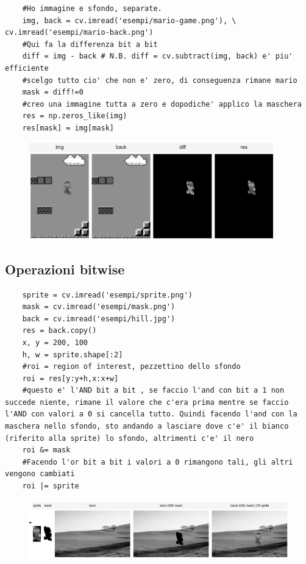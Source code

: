 \begin{lstlisting}
	#Ho immagine e sfondo, separate. 
	img, back = cv.imread('esempi/mario-game.png'), \ cv.imread('esempi/mario-back.png')
	#Qui fa la differenza bit a bit
	diff = img - back # N.B. diff = cv.subtract(img, back) e' piu' efficiente
	#scelgo tutto cio' che non e' zero, di conseguenza rimane mario
	mask = diff!=0 
	#creo una immagine tutta a zero e dopodiche' applico la maschera
	res = np.zeros_like(img) 
	res[mask] = img[mask]
\end{lstlisting}

\begin{figure}[htp]
	\includegraphics[width=300pt]{./immagini/mario_differenza.png}
	\label{img:mario_differenza}
\end{figure}

\newpage

\subsection{Operazioni bitwise}

\begin{lstlisting}
	sprite = cv.imread('esempi/sprite.png')
	mask = cv.imread('esempi/mask.png')
	back = cv.imread('esempi/hill.jpg')
	res = back.copy()
	x, y = 200, 100
	h, w = sprite.shape[:2]
	#roi = region of interest, pezzettino dello sfondo
	roi = res[y:y+h,x:x+w]
	#questo e' l'AND bit a bit , se faccio l'and con bit a 1 non succede niente, rimane il valore che c'era prima mentre se faccio l'AND con valori a 0 si cancella tutto. Quindi facendo l'and con la maschera nello sfondo, sto andando a lasciare dove c'e' il bianco (riferito alla sprite) lo sfondo, altrimenti c'e' il nero
	roi &= mask	
	#Facendo l'or bit a bit i valori a 0 rimangono tali, gli altri vengono cambiati
	roi |= sprite
\end{lstlisting}

\begin{figure}[htp]
	\includegraphics[width=\linewidth]{./immagini/mario_bit.png}
	\label{img:mario_bit}
\end{figure}


